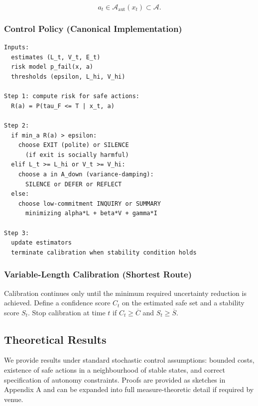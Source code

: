 \begin{equation}
a_t \in \mathcal{A}_{\mathrm{aut}}(x_t) \subset \mathcal{A}.
\label{eq:pp-autonomy}
\end{equation}

\subsubsection{Control Policy (Canonical Implementation)}
\label{sec:pp-control-policy}

\begin{lstlisting}[basicstyle=\ttfamily\small,frame=single]
Inputs:
  estimates (L_t, V_t, E_t)
  risk model p_fail(x, a)
  thresholds (epsilon, L_hi, V_hi)

Step 1: compute risk for safe actions:
  R(a) = P(tau_F <= T | x_t, a)

Step 2:
  if min_a R(a) > epsilon:
    choose EXIT (polite) or SILENCE
      (if exit is socially harmful)
  elif L_t >= L_hi or V_t >= V_hi:
    choose a in A_down (variance-damping):
      SILENCE or DEFER or REFLECT
  else:
    choose low-commitment INQUIRY or SUMMARY
      minimizing alpha*L + beta*V + gamma*I

Step 3:
  update estimators
  terminate calibration when stability condition holds
\end{lstlisting}

\subsubsection{Variable-Length Calibration (Shortest Route)}
\label{sec:pp-variable-length}

Calibration continues only until the minimum required uncertainty
reduction is achieved. Define a confidence score $C_t$ on the
estimated safe set and a stability score $S_t$. Stop calibration at
time $t$ if $C_t \ge \overline{C}$ and $S_t \ge \overline{S}$.

\subsection{Theoretical Results}
\label{sec:pp-theoretical-results}

We provide results under standard stochastic control assumptions:
bounded costs, existence of safe actions in a neighbourhood of
stable states, and correct specification of autonomy constraints.
Proofs are provided as sketches in Appendix A and can be expanded
into full measure-theoretic detail if required by venue.

